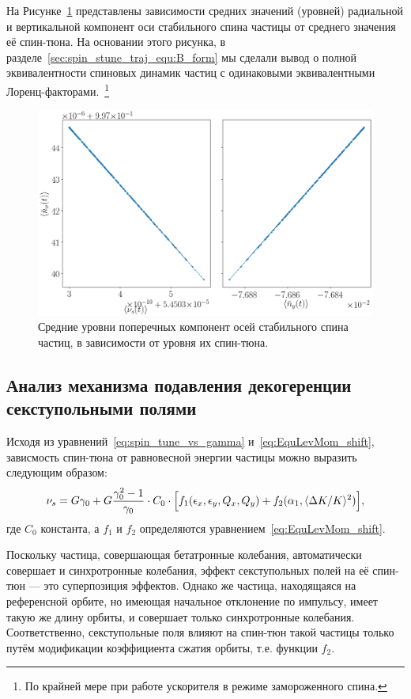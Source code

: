 На Рисунке~\ref{decoh:fig:nbar_vs_ST} представлены зависимости средних значений (уровней) радиальной и вертикальной компонент оси стабильного спина частицы от среднего значения её спин-тюна. На основании этого рисунка, в разделе~\ref{sec:spin_stune_traj_equ:B_form} мы сделали вывод о полной эквивалентности спиновых динамик частиц с одинаковыми эквивалентными Лоренц-факторами.~\footnote{По крайней мере при работе ускорителя в режиме замороженного спина.}
\begin{figure}[H]
	\centering
	\includegraphics[height=.35\paperheight]{images/decoh_sim/mean_n_bar_vs_spin_tune}
	\caption{Средние уровни поперечных компонент осей стабильного спина частиц, в зависимости от уровня их спин-тюна.\label{decoh:fig:nbar_vs_ST}}
\end{figure}

\subsection{Анализ механизма подавления декогеренции секступольными полями}\label{sec:sext_decoh_suppression_effect_analysis}
Исходя из уравнений~\eqref{eq:spin_tune_vs_gamma} и~\eqref{eq:EquLevMom_shift}, зависмость спин-тюна от равновесной энергии частицы можно выразить следующим образом:
\[
\nu_s = G\gamma_0 + G\frac{\gamma_0^2-1}{\gamma_0}\cdot C_0\cdot \Big[f_1(\epsilon_x, \epsilon_y, Q_x, Q_y) +  f_2(\alpha_1, \avg{\Delta K/K}^2)\Big],
\]
где $C_0$ константа, а $f_1$ и $f_2$ определяются уравнением~\eqref{eq:EquLevMom_shift}.

Поскольку частица, совершающая бетатронные колебания, автоматически совершает и 
синхротронные колебания, эффект секступольных полей на её спин-тюн --- это суперпозиция эффектов. 
Однако же частица, находящаяся на референсной орбите, но имеющая начальное отклонение по импульсу, 
имеет такую же длину орбиты, и совершает только синхротронные колебания. 
Соответственно, секступольные поля влияют на спин-тюн такой частицы только 
путём модификации коэффициента сжатия орбиты, т.е. функции $f_2$. 

